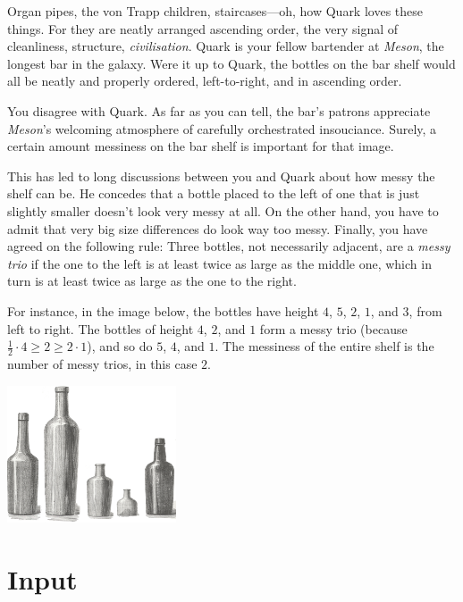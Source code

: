 

\noindent
Organ pipes, the von Trapp children, staircases---oh, how Quark loves these things.
For they are neatly arranged ascending order, the very signal of cleanliness, structure, \emph{civilisation}.
Quark is your fellow bartender at \emph{Meson}, the longest bar in the galaxy.
Were it up to Quark, the bottles on the bar shelf would all be neatly and properly ordered, left-to-right, and in ascending order.

You disagree with Quark.
As far as you can tell, the bar's patrons appreciate \emph{Meson}'s welcoming atmosphere of carefully orchestrated insouciance. 
Surely, a certain amount messiness on the bar shelf is important for that image.

This has led to long discussions between you and Quark about how messy the shelf can be.
He concedes that a bottle placed to the left of one that is just slightly smaller doesn't look very messy at all.
On the other hand, you have to admit that very big size differences do look way too messy.
Finally, you have agreed on the following rule:
Three bottles, not necessarily adjacent, are a \emph{messy trio} if the one to the left is at least twice as large as the middle one, which in turn is at least twice as large as the one to the right.

\medskip
For instance, in the image below, the bottles have height $4$, $5$, $2$, $1$, and $3$, from left to right.
The bottles of height $4$, $2$, and $1$ form a messy trio (because $\frac12 \cdot 4 \geq 2\geq 2\cdot  1$), and so do $5$, $4$, and $1$.
The messiness of the entire shelf is the number of messy trios, in this case $2$.

\medskip
\includegraphics[width = 5cm]{img/messy_bottles.png}



\section*{Input}

